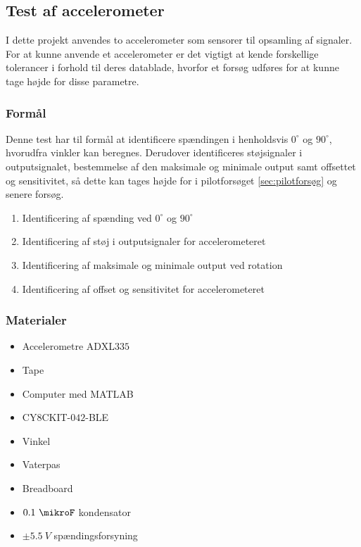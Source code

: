 \subsection{Test af accelerometer}
I dette projekt anvendes to accelerometer som sensorer til opsamling af signaler. For at kunne anvende et accelerometer er det vigtigt at kende forskellige tolerancer i forhold til deres datablade, hvorfor et forsøg udføres for at kunne tage højde for disse parametre.

\subsubsection{Formål}
Denne test har til formål at identificere spændingen i henholdsvis $0^{\circ}$ og $90^{\circ}$, hvorudfra vinkler kan beregnes. Derudover identificeres støjsignaler i outputsignalet, bestemmelse af den maksimale og minimale output samt offsettet og sensitivitet, så dette kan tages højde for i pilotforsøget \autoref{sec:pilotforsøg} og senere forsøg. 

\begin{enumerate}
\item Identificering af spænding ved $0^{\circ}$ og $90^{\circ}$
\item Identificering af støj i outputsignaler for accelerometeret
\item Identificering af maksimale og minimale output ved rotation
\item Identificering af offset og sensitivitet for accelerometeret
\end{enumerate}

\subsubsection{Materialer}
\begin{itemize}
\item Accelerometre ADXL$335$
\item Tape
\item Computer med MATLAB
\item CY$8$CKIT-$042$-BLE
\item Vinkel
\item Vaterpas
\item Breadboard
\item $0.1~\mikroF$ kondensator 
\item $\pm 5.5~V$ spændingsforsyning 
\end{itemize}

